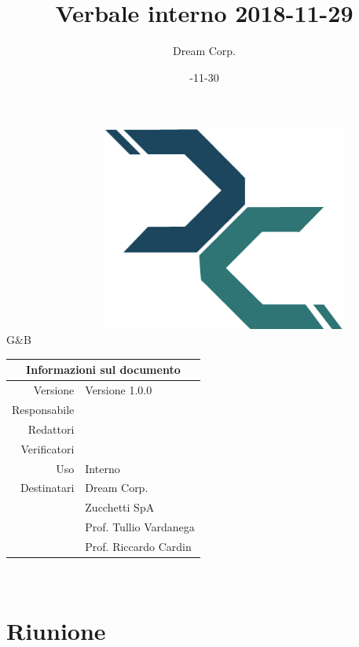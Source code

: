 \documentclass[12pt]{article}
\title{\myfont Verbale interno 2018-11-29}
\author{Dream Corp.}
\date{\myfont 2018-11-30}
\newcommand{\red}{\mat}
\newcommand{\verp}{\daL}
\newcommand{\res}{\daG}
\newcommand{\version}{Versione 1.0.0}
\newcommand{\use}{Interno}
\begin{document}
\maketitle
	\begin{center}
	~~~~~~~~~~~~~~~~~~\includegraphics[width = 80mm]{../../logo.png}
	\newline
	\huge 
	\\G\&B
	
	\begin{table}[!htpb]
		\centering
		\begin{tabular}{r|l}
			\multicolumn{2}{c}{Informazioni sul documento}\\
			\hline
			Versione & \version \\
			Responsabile & \res\\
			Redattori & \red \\
			Verificatori & \verp\\
			Uso & \use\\
			Destinatari & Dream Corp. \\
			& Zucchetti SpA\\
			& Prof. Tullio Vardanega\\
			& Prof. Riccardo Cardin\\
		\end{tabular}
	\end{table}
	
	\end{center}
	\newpage

\newline
~\newline


\section{Riunione}
\end{document}
